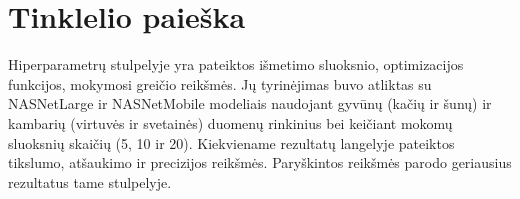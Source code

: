 \documentclass{VUMIFPSbakalaurinis}
\begin{document}
\printbibliography[heading=bibintoc]





\appendix
\section{Tinklelio paieška}
Hiperparametrų stulpelyje yra pateiktos išmetimo sluoksnio, optimizacijos funkcijos, mokymosi greičio reikšmės. Jų tyrinėjimas buvo atliktas su NASNetLarge ir NASNetMobile modeliais naudojant gyvūnų (kačių ir šunų) ir kambarių (virtuvės ir svetainės) duomenų rinkinius bei keičiant mokomų sluoksnių skaičių (5, 10 ir 20). Kiekviename rezultatų langelyje pateiktos tikslumo, atšaukimo ir precizijos reikšmės. Paryškintos reikšmės parodo geriausius rezultatus tame stulpelyje. 
\setlength\LTleft{-0.8in}
\setlength\LTright{-1in}
\end{document}
